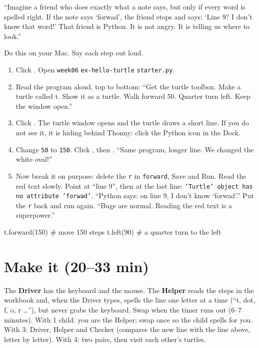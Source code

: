 \begin{analogy}
\enquote{Imagine a friend who does exactly what a note says, but only if every word is spelled right. If the note says \enquote{forwad}, the friend stops and says: \enquote{Line 9? I don't know that word!} That friend is Python. It is not angry. It is telling us where to look.}
\end{analogy}

\begin{workedexample}
Do this on your Mac. Say each step out loud.
\begin{enumerate}[leftmargin=1.4em,itemsep=1pt]
  \item Click . Open \texttt{week06} \textrightarrow{} \texttt{ex-hello-turtle} \textrightarrow{} \texttt{starter.py}.
  \item Read the program aloud, top to bottom: \enquote{Get the turtle toolbox. Make a turtle called t. Show it as a turtle. Walk forward 50. Quarter turn left. Keep the window open.}
  \item Click . The turtle window opens and the turtle draws a short line. If you do not see it, it is hiding behind Thonny: click the Python icon in the Dock.
  \item Change \texttt{50} to \texttt{150}. Click , then . \enquote{Same program, longer line. We changed the white oval!}
  \item Now break it on purpose: delete the \texttt{r} in \texttt{forward}, Save and Run. Read the red text slowly. Point at \enquote{line 9}, then at the last line: \texttt{'Turtle' object has no attribute 'forwad'}. \enquote{Python says: on line 9, I don't know \enquote{forwad}.} Put the \texttt{r} back and run again. \enquote{Bugs are normal. Reading the red text is a superpower.}
\end{enumerate}
\begin{pycode}
t.forward(150)   # move 150 steps
t.left(90)       # a quarter turn to the left
\end{pycode}
\end{workedexample}

\section{Make it (20--33 min)}
\begin{pairroles}
The \textbf{Driver} has the keyboard and the mouse. The \textbf{Helper} reads the steps in the workbook and, when the Driver types, spells the line one letter at a time (\enquote{t, dot, f, o, r \ldots}), but never grabs the keyboard. Swap when the timer runs out (6--7 minutes). With 1 child: you are the Helper; swap once so the child spells for you. With 3: Driver, Helper and Checker (compares the new line with the line above, letter by letter). With 4: two pairs, then visit each other's turtles.
\end{pairroles}

